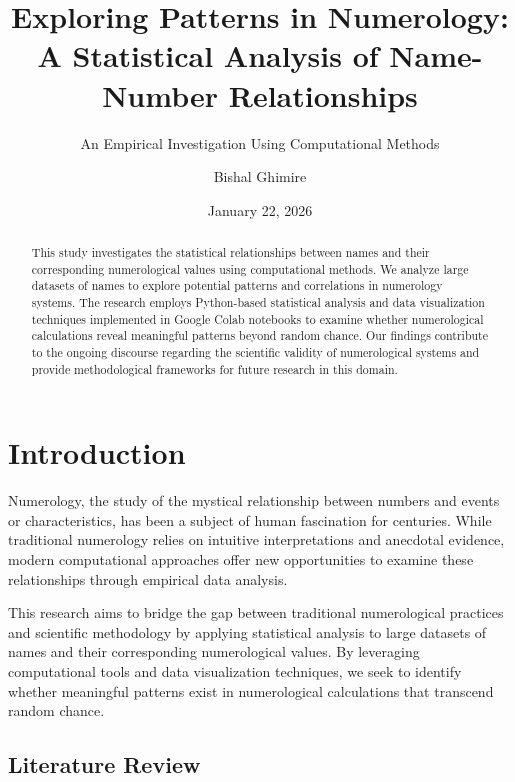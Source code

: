 \documentclass[
  american,
  11pt,
  oneside]{article}
\title{Exploring Patterns in Numerology: A Statistical Analysis of
Name-Number Relationships}
\subtitle{An Empirical Investigation Using Computational Methods}
\author{Bishal Ghimire}
\date{January 22, 2026}
\begin{document}
\maketitle
\begin{abstract}
This study investigates the statistical relationships between names and
their corresponding numerological values using computational methods. We
analyze large datasets of names to explore potential patterns and
correlations in numerology systems. The research employs Python-based
statistical analysis and data visualization techniques implemented in
Google Colab notebooks to examine whether numerological calculations
reveal meaningful patterns beyond random chance. Our findings contribute
to the ongoing discourse regarding the scientific validity of
numerological systems and provide methodological frameworks for future
research in this domain.
\end{abstract}




\section{Introduction}\label{introduction}

Numerology, the study of the mystical relationship between numbers and
events or characteristics, has been a subject of human fascination for
centuries. While traditional numerology relies on intuitive
interpretations and anecdotal evidence, modern computational approaches
offer new opportunities to examine these relationships through empirical
data analysis.

This research aims to bridge the gap between traditional numerological
practices and scientific methodology by applying statistical analysis to
large datasets of names and their corresponding numerological values. By
leveraging computational tools and data visualization techniques, we
seek to identify whether meaningful patterns exist in numerological
calculations that transcend random chance.

\subsection{Literature Review}\label{literature-review}
\end{document}
